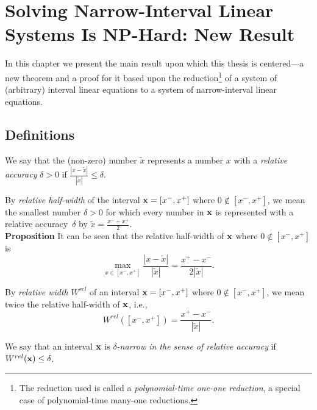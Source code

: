 
\chapter{Solving Narrow-Interval Linear Systems Is
NP-Hard: New Result} \label{NewResult}

In this chapter we present the main result upon which this thesis is
centered---a new theorem and a proof for it based upon the
reduction\footnote{The reduction used is called a {\em polynomial-time
one-one reduction}, a special case of polynomial-time many-one reductions.}
of a system of (arbitrary) interval linear equations to a system of
narrow-interval linear equations.

\section{Definitions}

\begin{definition}
{\rm We say that the (non-zero) number $\tilde x$ represents a number $x$ with
a {\em relative accuracy\/} $\delta>0$ if $\displaystyle{\frac{|x-\tilde x|}
{|\tilde x|}}\leq\delta$.}
\end{definition}

\begin{definition}
{\rm By {\em relative half-width\/} of the interval ${\bf x}=[x^-,x^+]$
where $0\not\in[x^-,x^+]$, we
mean the smallest number $\delta>0$ for which every number in ${\bf x}$ is
represented with a relative accuracy~$\delta$ by $\tilde x=\displaystyle{
\frac{x^-+x^+}{2}}$.\\[0.5pc]
{\bf Proposition} It can be seen that the relative half-width of ${\bf x}$
where $0\not\in[x^-,x^+]$ is}
$$
  \max_{x\in [x^-,x^+]}\frac{|x-\tilde x|}{|\tilde x|}=
   \frac{x^+-x^-}{2|\tilde x|}.
$$
\end{definition}

\begin{definition}
{\rm By {\em relative width\/} $W^{rel}$ of an interval ${\bf x}=[x^-,x^+]$
where $0\not\in[x^-,x^+]$,
we mean twice the relative half-width of ${\bf x}$, i.e.,
$$
  W^{rel}([x^-,x^+])=\frac{x^+-x^-}{|\tilde x|}.
$$}
\end{definition}

\begin{definition}
{\rm We say that an interval ${\bf x}$ is {\em $\delta$-narrow in the sense 
of relative accuracy\/} if $W^{rel}({\bf x})\leq\delta$.}
\end{definition}

